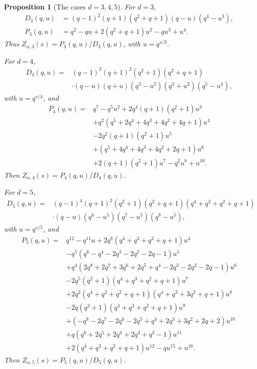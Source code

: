 \documentclass[11pt]{amsart}
\theoremstyle{plain}
\newtheorem{proposition}[theorem]{Proposition}
\theoremstyle{definition}
\numberwithin{equation}{section}
\begin{document}
\begin{proposition}[The cases $d=3,4,5$]\label{prop:explicit-low-rank-zeta}
For $d=3$,
\begin{align*}
  D_3(q,u)&=(q-1)^2(q+1)(q^2+q+1)(q-u)(q^4-u^3),\\
  P_3(q,u)&=q^2-qu+2(q^2+q+1)u^2-qu^3+u^4.
\end{align*}
Thus $Z_{\alpha,3}(s)=P_3(q,u)/D_3(q,u)$, with $u=q^{s/3}$.

For $d=4$,
\begin{align*}
  D_4(q,u)={}&(q-1)^3(q+1)^2(q^2+1)(q^2+q+1)\\
  &\cdot(q-u)(q+u)(q^3-u^2)(q^3+u^2)(q^5-u^4),
\end{align*}
with $u=q^{s/4}$, and
\begin{align*}
  P_4(q,u)={}&q^7-q^5u^2+2q^4(q+1)(q^2+1)u^3\\
  &+q^2(q^5+2q^4+4q^3+4q^2+4q+1)u^4\\
  &-2q^2(q+1)(q^2+1)u^5\\
  &+(q^5+4q^4+4q^3+4q^2+2q+1)u^6\\
  &+2(q+1)(q^2+1)u^7-q^2u^8+u^{10}.
\end{align*}
Then $Z_{\alpha,4}(s)=P_4(q,u)/D_4(q,u)$.

For $d=5$,
\begin{align*}
  D_5(q,u)={}&(q-1)^4(q+1)^2(q^2+1)(q^2+q+1)(q^4+q^3+q^2+q+1)\\
  &\cdot(q-u)(q^6-u^5)(q^7-u^5)(q^8-u^5),
\end{align*}
with $u=q^{s/5}$, and
\begin{align*}
  P_5(q,u)={}&q^{12}-q^{11}u+2q^8(q^4+q^3+q^2+q+1)u^4\\
  &-q^5(q^6-q^4-2q^3-2q^2-2q-1)u^5\\
  &+q^4(2q^8+2q^7+3q^6+2q^5+q^4-2q^3-2q^2-2q-1)u^6\\
  &-2q^5(q^2+1)(q^4+q^3+q^2+q+1)u^7\\
  &+2q^2(q^4+q^3+q^2+q+1)(q^4+q^3+3q^2+q+1)u^8\\
  &-2q(q^2+1)(q^4+q^3+q^2+q+1)u^9\\
  &+(-q^8-2q^7-2q^6-2q^5+q^4+2q^3+3q^2+2q+2)u^{10}\\
  &+q(q^6+2q^5+2q^4+2q^3+q^2-1)u^{11}\\
  &+2(q^4+q^3+q^2+q+1)u^{12}-qu^{15}+u^{16}.
\end{align*}
Then $Z_{\alpha,5}(s)=P_5(q,u)/D_5(q,u)$.
\end{proposition}
\end{document}
